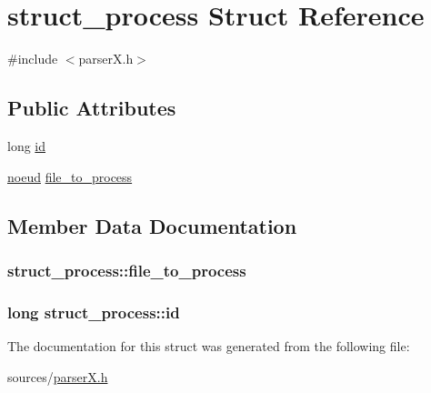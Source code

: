 \hypertarget{structstruct__process}{\section{struct\-\_\-process Struct Reference}
\label{structstruct__process}
}


{\ttfamily \#include $<$parser\-X.\-h$>$}

\subsection*{Public Attributes}
\begin{DoxyCompactItemize}
\item 
long \hyperlink{structstruct__process_acfe36eff6bc28dc97e49e837f5582936}{id}
\item 
\hyperlink{structnoeud}{noeud} \hyperlink{structstruct__process_a9bbe07fac27bb1a68963b1e3bc0325c1}{file\-\_\-to\-\_\-process}
\end{DoxyCompactItemize}


\subsection{Member Data Documentation}
\hypertarget{structstruct__process_a9bbe07fac27bb1a68963b1e3bc0325c1}{
\subsubsection[{file\-\_\-to\-\_\-process}]{ struct\-\_\-process\-::file\-\_\-to\-\_\-process}}\label{structstruct__process_a9bbe07fac27bb1a68963b1e3bc0325c1}
\hypertarget{structstruct__process_acfe36eff6bc28dc97e49e837f5582936}{
\subsubsection[{id}]{\setlength{\rightskip}{0pt plus 5cm}long struct\-\_\-process\-::id}}\label{structstruct__process_acfe36eff6bc28dc97e49e837f5582936}


The documentation for this struct was generated from the following file\-:\begin{DoxyCompactItemize}
\item 
sources/\hyperlink{parser_x_8h}{parser\-X.\-h}\end{DoxyCompactItemize}
